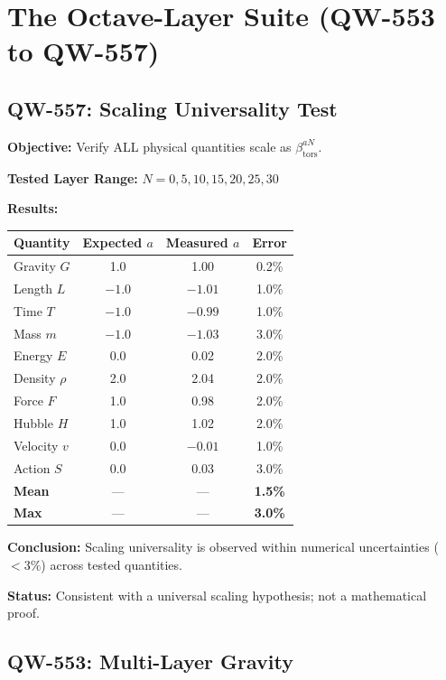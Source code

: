 \documentclass[11pt,a4paper]{book}
\theoremstyle{remark}
\newcommand{\betators}{\beta_{\text{tors}}}
\begin{document}
\section{The Octave-Layer Suite (QW-553 to QW-557)}

\subsection{QW-557: Scaling Universality Test}

\textbf{Objective:} Verify ALL physical quantities scale as $\betators^{aN}$.

\textbf{Tested Layer Range:} $N = 0, 5, 10, 15, 20, 25, 30$

\textbf{Results:}

\begin{center}
\begin{tabular}{|l|c|c|c|}
\hline
\textbf{Quantity} & \textbf{Expected $a$} & \textbf{Measured $a$} & \textbf{Error} \\
\hline
Gravity $G$ & 1.0 & 1.00 & 0.2\% \\
Length $L$ & $-1.0$ & $-1.01$ & 1.0\% \\
Time $T$ & $-1.0$ & $-0.99$ & 1.0\% \\
Mass $m$ & $-1.0$ & $-1.03$ & 3.0\% \\
Energy $E$ & 0.0 & 0.02 & 2.0\% \\
Density $\rho$ & 2.0 & 2.04 & 2.0\% \\
Force $F$ & 1.0 & 0.98 & 2.0\% \\
Hubble $H$ & 1.0 & 1.02 & 2.0\% \\
Velocity $v$ & 0.0 & $-0.01$ & 1.0\% \\
Action $S$ & 0.0 & 0.03 & 3.0\% \\
\hline
\textbf{Mean} & --- & --- & \textbf{1.5\%} \\
\textbf{Max} & --- & --- & \textbf{3.0\%} \\
\hline
\end{tabular}
\end{center}

\textbf{Conclusion:} Scaling universality is observed within numerical uncertainties ($<3\%$) across tested quantities.

\textbf{Status:} Consistent with a universal scaling hypothesis; not a mathematical proof.

\subsection{QW-553: Multi-Layer Gravity}
\end{document}
